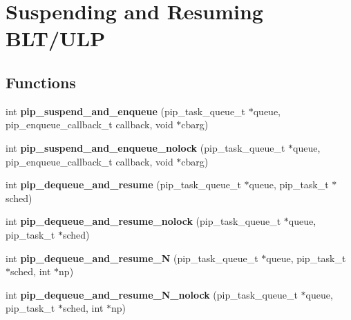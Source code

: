 \hypertarget{group__ulp-2-suspension}{\section{Suspending and Resuming B\-L\-T/\-U\-L\-P}
\label{group__ulp-2-suspension}
}
\subsection*{Functions}
\begin{DoxyCompactItemize}
\item 
\hypertarget{group__ulp-2-suspension_ga7dbf7e64e78cd00ef62c3bb04f289a68}{int {\bfseries pip\-\_\-suspend\-\_\-and\-\_\-enqueue} (pip\-\_\-task\-\_\-queue\-\_\-t $\ast$queue, pip\-\_\-enqueue\-\_\-callback\-\_\-t callback, void $\ast$cbarg)}\label{group__ulp-2-suspension_ga7dbf7e64e78cd00ef62c3bb04f289a68}

\item 
\hypertarget{group__ulp-2-suspension_gab78d289ab89fa2981f2910849b1b2df7}{int {\bfseries pip\-\_\-suspend\-\_\-and\-\_\-enqueue\-\_\-nolock} (pip\-\_\-task\-\_\-queue\-\_\-t $\ast$queue, pip\-\_\-enqueue\-\_\-callback\-\_\-t callback, void $\ast$cbarg)}\label{group__ulp-2-suspension_gab78d289ab89fa2981f2910849b1b2df7}

\item 
\hypertarget{group__ulp-2-suspension_gaaff299f195e2397f17cf11016c8a394f}{int {\bfseries pip\-\_\-dequeue\-\_\-and\-\_\-resume} (pip\-\_\-task\-\_\-queue\-\_\-t $\ast$queue, pip\-\_\-task\-\_\-t $\ast$sched)}\label{group__ulp-2-suspension_gaaff299f195e2397f17cf11016c8a394f}

\item 
\hypertarget{group__ulp-2-suspension_gab3c26770ac6de70ad11239dc301bd403}{int {\bfseries pip\-\_\-dequeue\-\_\-and\-\_\-resume\-\_\-nolock} (pip\-\_\-task\-\_\-queue\-\_\-t $\ast$queue, pip\-\_\-task\-\_\-t $\ast$sched)}\label{group__ulp-2-suspension_gab3c26770ac6de70ad11239dc301bd403}

\item 
\hypertarget{group__ulp-2-suspension_gac26e54557d8e89fcdcb52a9df6c65998}{int {\bfseries pip\-\_\-dequeue\-\_\-and\-\_\-resume\-\_\-\-N} (pip\-\_\-task\-\_\-queue\-\_\-t $\ast$queue, pip\-\_\-task\-\_\-t $\ast$sched, int $\ast$np)}\label{group__ulp-2-suspension_gac26e54557d8e89fcdcb52a9df6c65998}

\item 
\hypertarget{group__ulp-2-suspension_ga939e70924803be491c2f6f10b364e803}{int {\bfseries pip\-\_\-dequeue\-\_\-and\-\_\-resume\-\_\-\-N\-\_\-nolock} (pip\-\_\-task\-\_\-queue\-\_\-t $\ast$queue, pip\-\_\-task\-\_\-t $\ast$sched, int $\ast$np)}\label{group__ulp-2-suspension_ga939e70924803be491c2f6f10b364e803}

\end{DoxyCompactItemize}


